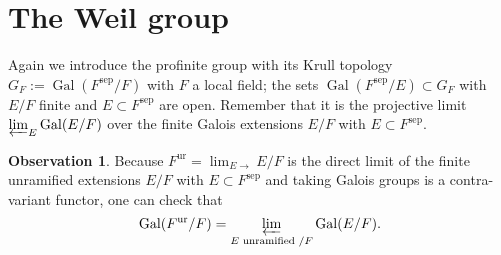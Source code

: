 \documentclass[12pt]{article}
\theoremstyle{plain}
\theoremstyle{definition}
\newtheorem{obs}[theorem]{Observation}
\newcommand{\Gal}[2]{\operatorname{Gal} ( #1 / #2 )}
\newcommand{\sep}[1]{{#1}^{\operatorname{sep}}}
\newcommand{\ur}[1]{{#1}^{\operatorname{ur}}}
\begin{document}
\section{The Weil group}


Again we introduce the profinite group with its Krull topology $G_F := \Gal {\sep F} F$ with $F$ a local field; the sets $\Gal {\sep F} E \subset G_F$ with $E/F$ finite and $E  \subset \sep F$ are open. Remember that it is the projective limit $\varprojlim_E \Gal E F$ over the finite Galois extensions $E/F$ with $E \subset \sep F$.

\begin{obs}\label{obs:write Gal Fur /F as a projective limit}
 Because $\ur F = \lim_{E \longrightarrow} E/F$ is the direct limit of the finite unramified extensions $E / F$ with $E \subset \sep F$ and taking Galois groups is a contra-variant functor, one can check that
 \[
     \Gal {\ur F } F = \varprojlim_{E \text{ unramified }/F} \Gal E F.
 \]
\end{obs}
\end{document}
